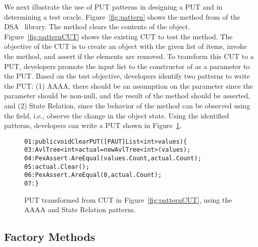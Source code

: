 We next illustrate the use of PUT patterns in designing a PUT and in determining a test oracle. Figure~\ref{fig:pattern} shows the  method from  of the DSA~\cite{dsa} library. The  method clears the contents of the  object. Figure~\ref{fig:patternCUT} shows the existing CUT to test the  method. The objective of the CUT is to create an  object with the given list of items, invoke the  method, and assert if the elements are removed. To transform this CUT to a PUT, developers promote the input list to the constructor of  as a parameter to the PUT. Based on the test objective, developers identify two patterns to write the PUT: (1) AAAA, there should be an assumption on the parameter since the parameter should be non-null, and the result of the  method should be asserted, and (2) State Relation, since the behavior of the  method can be observed using the  field, i.e., observe the change in the object state. Using the identified patterns, developers can write a PUT shown in Figure~\ref{fig:patternPUT}. 

\begin{figure}
\begin{CodeOut}        
\begin{alltt}
01: public void ClearPUT([PAUT]List<int> values) \{
03: \hspace{0.07in}AvlTree<int> actual = new AvlTree<int>(values);
04: \hspace{0.07in}PexAssert.AreEqual(values.Count, actual.Count);
05: \hspace{0.07in}actual.Clear();
06: \hspace{0.07in}PexAssert.AreEqual(0, actual.Count);
07: \}
\end{alltt}
\end{CodeOut}\vspace*{-4ex}
\caption{PUT transformed from CUT in Figure~\ref{fig:patternCUT}, using the AAAA and State Relation patterns.} \vspace*{-4ex}
\label{fig:patternPUT}%
\end{figure}

\subsection{Factory Methods}
\label{sec:factory}

